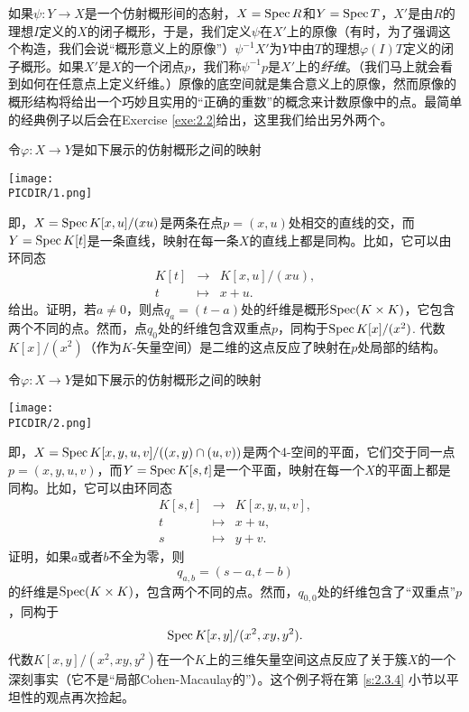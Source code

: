 如果$\psi:Y\to X$是一个仿射概形间的态射，$X=\operatorname{Spec} R$和$Y=\operatorname{Spec} T$，$X'$是由$R$的理想$I$定义的$X$的闭子概形，于是，我们定义$\psi$在$X'$上的原像（有时，为了强调这个构造，我们会说“概形意义上的原像”）$\psi^{-1}X'$为$Y$中由$T$的理想$\varphi(I)T$定义的闭子概形。如果$X'$是$X$的一个闭点$p$，我们称$\psi^{-1}p$是$X'$上的\textit{纤维}。（我们马上就会看到如何在任意点上定义纤维。）原像的底空间就是集合意义上的原像，然而原像的概形结构将给出一个巧妙且实用的“正确的重数”的概念来计数原像中的点。最简单的经典例子以后会在Exercise \ref{exe:2.2}给出，这里我们给出另外两个。

\begin{exe}\label{exe:1.43}
\begin{compactenum}[(a)]
\item 令$\varphi:X\to Y$是如下展示的仿射概形之间的映射
\begin{center}\texttt{[image: \\PICDIR/1.png]}\end{center}
即，$X=\operatorname{Spec} K[x,u]/(xu)$是两条在点$p=(x,u)$处相交的直线的交，而$Y=\operatorname{Spec} K[t]$是一条直线，映射在每一条$X$的直线上都是同构。比如，它可以由环同态
\[
	\begin{array}{rcl}
	K[t]&\to &K[x,u]/(xu),\\
	t&\mapsto&x+u.
	\end{array}
\]
给出。证明，若$a\neq 0$，则点$q_a=(t-a)$处的纤维是概形$\operatorname{Spec}(K\times K)$，它包含两个不同的点。然而，点$q_0$处的纤维包含双重点$p$，同构于$\operatorname{Spec} K[x]/(x^2)$. 代数$K[x]/(x^2)$（作为$K$-矢量空间）是二维的这点反应了映射在$p$处局部的结构。
\item 令$\varphi:X\to Y$是如下展示的仿射概形之间的映射
\begin{center}\texttt{[image: \\PICDIR/2.png]}\end{center}
即，$X=\operatorname{Spec} K[x,y,u,v]/((x,y)\cap (u,v))$是两个4-空间的平面，它们交于同一点$p=(x,y,u,v)$，而$Y=\operatorname{Spec} K[s,t]$是一个平面，映射在每一个$X$的平面上都是同构。比如，它可以由环同态
\[
	\begin{array}{rcl}
	K[s,t]&\to &K[x,y,u,v],\\
	t&\mapsto&x+u,\\
	s&\mapsto&y+v.
	\end{array}
\]
证明，如果$a$或者$b$不全为零，则
\[
	q_{a,b}=(s-a,t-b)
\]
的纤维是$\operatorname{Spec}(K\times K)$，包含两个不同的点。然而，$q_{0,0}$处的纤维包含了“双重点”$p$，同构于
\[
	\operatorname{Spec} K[x,y]/(x^2,xy,y^2).
\]
代数$K[x,y]/(x^2,xy,y^2)$在一个$K$上的三维矢量空间这点反应了关于簇$X$的一个深刻事实（它不是“局部Cohen-Macaulay的”）。这个例子将在第 \ref{s:2.3.4} 小节以平坦性的观点再次捡起。
\end{compactenum}
\end{exe}

